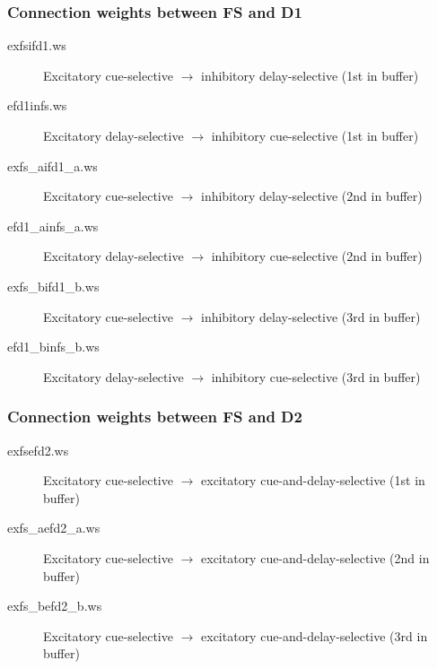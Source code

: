 \documentclass[12pt]{article}
\begin{document}
\subsubsection{Connection weights between FS and D1}
\begin{description}
  \item[exfsifd1.ws] Excitatory cue-selective $\rightarrow$
                     inhibitory delay-selective (1st in buffer)
  \item[efd1infs.ws] Excitatory delay-selective $\rightarrow$
                     inhibitory cue-selective (1st in buffer)
  \item[exfs\_aifd1\_a.ws] Excitatory cue-selective $\rightarrow$
                     inhibitory delay-selective (2nd in buffer)
  \item[efd1\_ainfs\_a.ws] Excitatory delay-selective $\rightarrow$
                     inhibitory cue-selective (2nd in buffer)
  \item[exfs\_bifd1\_b.ws] Excitatory cue-selective $\rightarrow$
                     inhibitory delay-selective (3rd in buffer)
  \item[efd1\_binfs\_b.ws] Excitatory delay-selective $\rightarrow$
                     inhibitory cue-selective (3rd in buffer)
\end{description}
\subsubsection{Connection weights between FS and D2}
\begin{description}
  \item[exfsefd2.ws] Excitatory cue-selective $\rightarrow$
                     excitatory cue-and-delay-selective (1st in buffer)
  \item[exfs\_aefd2\_a.ws] Excitatory cue-selective $\rightarrow$
                     excitatory cue-and-delay-selective (2nd in buffer)
  \item[exfs\_befd2\_b.ws] Excitatory cue-selective $\rightarrow$
                     excitatory cue-and-delay-selective (3rd in buffer)
\end{description}

\end{document}
